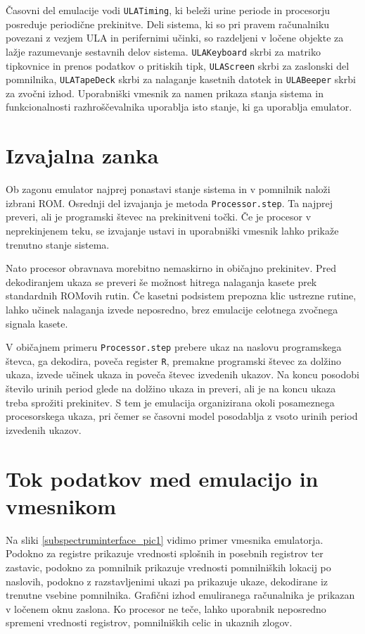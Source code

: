 \documentclass[a4paper, 12pt, openright]{book}
\begin{document}
    Časovni del emulacije vodi \texttt{ULATiming}, ki beleži urine periode in procesorju
    posreduje periodične prekinitve. Deli sistema, ki so pri pravem računalniku povezani
    z vezjem ULA in perifernimi učinki, so razdeljeni v ločene objekte za lažje
    razumevanje sestavnih delov sistema. \texttt{ULAKeyboard} skrbi za matriko
    tipkovnice in prenos podatkov o pritiskih tipk, \texttt{ULAScreen} skrbi za
    zaslonski del pomnilnika, \texttt{ULATapeDeck} skrbi za nalaganje kasetnih
    datotek in \texttt{ULABeeper} skrbi za zvočni izhod. Uporabniški vmesnik za
    namen prikaza stanja sistema in funkcionalnosti razhroščevalnika uporablja
    isto stanje, ki ga uporablja emulator.

    \section{Izvajalna zanka}

    Ob zagonu emulator najprej ponastavi stanje sistema in v pomnilnik naloži
    izbrani ROM. Osrednji del izvajanja je metoda \texttt{Processor.step}. Ta najprej
    preveri, ali je programski števec na prekinitveni točki. Če je procesor v neprekinjenem
    teku, se izvajanje ustavi in uporabniški vmesnik lahko prikaže trenutno
    stanje sistema.

    Nato procesor obravnava morebitno nemaskirno in običajno prekinitev. Pred dekodiranjem
    ukaza se preveri še možnost hitrega nalaganja kasete prek standardnih ROMovih
    rutin. Če kasetni podsistem prepozna klic ustrezne rutine, lahko učinek nalaganja
    izvede neposredno, brez emulacije celotnega zvočnega signala kasete.

    V običajnem primeru \texttt{Processor.step} prebere ukaz na naslovu programskega
    števca, ga dekodira, poveča register \texttt{R}, premakne programski števec za
    dolžino ukaza, izvede učinek ukaza in poveča števec izvedenih ukazov. Na koncu
    posodobi število urinih period glede na dolžino ukaza in preveri, ali je na
    koncu ukaza treba sprožiti prekinitev. S tem je emulacija organizirana okoli posameznega
    procesorskega ukaza, pri čemer se časovni model posodablja z vsoto urinih
    period izvedenih ukazov.

    \section{Tok podatkov med emulacijo in vmesnikom}

    Na sliki \ref{subspectruminterface_pic1} vidimo primer vmesnika emulatorja.
    Podokno za registre prikazuje vrednosti splošnih in posebnih registrov ter
    zastavic, podokno za pomnilnik prikazuje vrednosti pomnilniških lokacij po naslovih,
    podokno z razstavljenimi ukazi pa prikazuje ukaze, dekodirane iz trenutne vsebine
    pomnilnika. Grafični izhod emuliranega računalnika je prikazan v ločenem
    oknu zaslona. Ko procesor ne teče, lahko uporabnik neposredno spremeni
    vrednosti registrov, pomnilniških celic in ukaznih zlogov.
\end{document}
